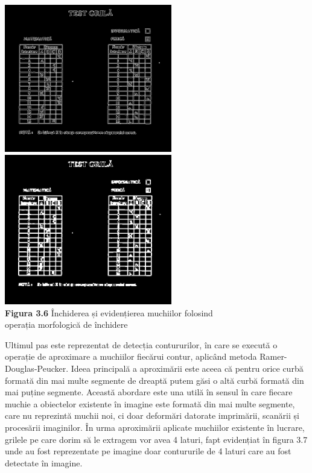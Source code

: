 \documentclass[a4paper,12pt]{report}
\newcommand\tab[1][1cm]{\hspace*{#1}}
\begin{document}
\begin {center} 
	\begin {footnotesize} 
		\includegraphics[width = 73mm]{fig3_6_1} 
		\includegraphics[width = 73mm]{fig3_6_2} \\
		\textbf  {Figura 3.6} Închiderea și evidențierea muchiilor folosind \\ operația morfologică de închidere
	\end {footnotesize} 
\end {center}
\tab Ultimul pas este reprezentat de detecția contururilor, în care se execută o operație de aproximare a muchiilor fiecărui contur, aplicând metoda Ramer-Douglas-Peucker. Ideea principală a aproximării este aceea că pentru orice curbă formată din mai multe segmente de dreaptă putem găsi o altă curbă formată din mai puține segmente. Această abordare este una utilă în sensul în care fiecare muchie a obiectelor existente în imagine este formată din mai multe segmente, care nu reprezintă muchii noi, ci doar deformări datorate imprimării, scanării și procesării imaginilor. În urma aproximării aplicate muchiilor existente în lucrare, grilele pe care dorim să le extragem vor avea 4 laturi, fapt evidențiat în figura 3.7 unde au fost reprezentate pe imagine doar contururile de 4 laturi care au fost detectate în imagine.
\end{document}
